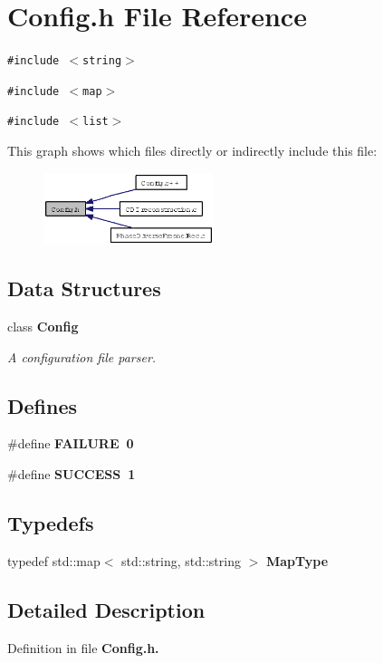 \section{Config.h File Reference}
\label{Config_8h}
{\tt \#include $<$string$>$}\par
{\tt \#include $<$map$>$}\par
{\tt \#include $<$list$>$}\par


This graph shows which files directly or indirectly include this file:\begin{figure}[H]
\begin{center}
\leavevmode
\includegraphics[width=141pt]{Config_8h__dep__incl}
\end{center}
\end{figure}
\subsection*{Data Structures}
\begin{CompactItemize}
\item 
class \bf{Config}
\begin{CompactList}\small\item\em A configuration file parser. \item\end{CompactList}\end{CompactItemize}
\subsection*{Defines}
\begin{CompactItemize}
\item 
\#define \bf{FAILURE}~0\label{Config_8h_bbb472742c04f963c42893209fc25a99}

\item 
\#define \bf{SUCCESS}~1\label{Config_8h_f5b270a7f68ce2ff7f4ddeb8dfe35550}

\end{CompactItemize}
\subsection*{Typedefs}
\begin{CompactItemize}
\item 
typedef std::map$<$ std::string, std::string $>$ \bf{Map\-Type}\label{Config_8h_275bcd3f474d4760f447496d66440a87}

\end{CompactItemize}


\subsection{Detailed Description}


Definition in file \bf{Config.h}.
